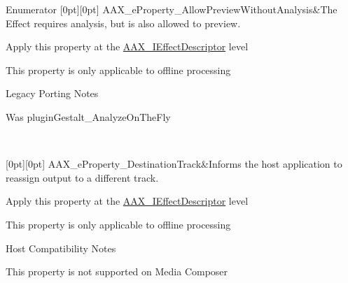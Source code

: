 \begin{DoxyEnumFields}{Enumerator}
[0pt][0pt]{}\mbox{\label{a00662_a13e384f22825afd3db6d68395b79ce0da9524773361ca8e712bef3547e8c46c9b}} 
A\+A\+X\+\_\+e\+Property\+\_\+\+Allow\+Preview\+Without\+Analysis&The Effect requires analysis, but is also allowed to preview. \begin{DoxyItemize}
\item Apply this property at the \mbox{\hyperlink{a01813}{A\+A\+X\+\_\+\+I\+Effect\+Descriptor}} level \item This property is only applicable to offline processing\end{DoxyItemize}
\begin{DoxyRefDesc}{Legacy Porting Notes}
\item[\mbox{\hyperlink{a00787__porting_notes000050}{Legacy Porting Notes}}]Was plugin\+Gestalt\+\_\+\+Analyze\+On\+The\+Fly \end{DoxyRefDesc}
\\
\hline

[0pt][0pt]{}\mbox{\label{a00662_a13e384f22825afd3db6d68395b79ce0dadd8839e5678c8880215e318197cc8d3a}} 
A\+A\+X\+\_\+e\+Property\+\_\+\+Destination\+Track&Informs the host application to reassign output to a different track. \begin{DoxyItemize}
\item Apply this property at the \mbox{\hyperlink{a01813}{A\+A\+X\+\_\+\+I\+Effect\+Descriptor}} level \item This property is only applicable to offline processing\end{DoxyItemize}
\begin{DoxyRefDesc}{Host Compatibility Notes}
\item[\mbox{\hyperlink{a00786__compatibility_notes000069}{Host Compatibility Notes}}]This property is not supported on Media Composer\end{DoxyRefDesc}



\end{DoxyEnumFields}
